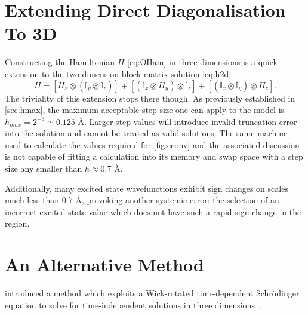 \section[Extending Direct Diagonalisation To \lin{3D}]{Extending Direct Diagonalisation To 3D}\label{sec:ddiagthree}

Constructing the Hamiltonian $H$ \cref{eq:OHam} in three dimensions is a quick extension to the two dimension block matrix solution \cref{eq:h2d}
\begin{equation}
H = \left[H_x \otimes (\mathbb{I}_y \otimes \mathbb{I}_z)\right] + \left[(\mathbb{I}_x \otimes H_y) \otimes \mathbb{I}_z\right] + \left[(\mathbb{I}_x \otimes \mathbb{I}_y) \otimes H_z\right].
\label{eq:h3d}
\end{equation}
The triviality of this extension stops there though.
As previously established in \cref{sec:hmax}, the maximum acceptable step size one can apply to the model is $h_{max} = 2^{-3} \simeq 0.125$ Å.
Larger step values will introduce invalid truncation error into the solution and cannot be treated as valid solutions.
The same machine used to calculate the values required for \cref{fig:econv} and the associated discussion is not capable of fitting a  calculation into its memory and swap space with a step size any smaller than $h \approx 0.7$ Å.

Additionally, many excited state wavefunctions exhibit sign changes on scales much less than $0.7$ Å, provoking another systemic error: the selection of an incorrect excited state value which does not have such a rapid sign change in the region.

\section{An Alternative Method}\label{sec:meth3d}

\citeauthor{Sudiarta2009} introduced a method which exploits a Wick-rotated time-dependent Schr\"{o}dinger equation to solve for time-independent solutions in three dimensions~\cite{Sudiarta2009}.

